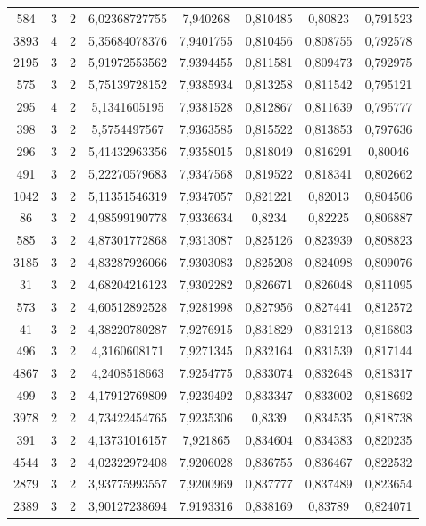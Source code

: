 \begin{longtable}{|c|c|c|c|c|c|c|c|}
584 & 3 & 2 & 6,02368727755 & 7,940268 & 0,810485 & 0,80823 & 0,791523 \\
3893 & 4 & 2 & 5,35684078376 & 7,9401755 & 0,810456 & 0,808755 & 0,792578 \\
2195 & 3 & 2 & 5,91972553562 & 7,9394455 & 0,811581 & 0,809473 & 0,792975 \\
575 & 3 & 2 & 5,75139728152 & 7,9385934 & 0,813258 & 0,811542 & 0,795121 \\
295 & 4 & 2 & 5,1341605195 & 7,9381528 & 0,812867 & 0,811639 & 0,795777 \\
398 & 3 & 2 & 5,5754497567 & 7,9363585 & 0,815522 & 0,813853 & 0,797636 \\
296 & 3 & 2 & 5,41432963356 & 7,9358015 & 0,818049 & 0,816291 & 0,80046 \\
491 & 3 & 2 & 5,22270579683 & 7,9347568 & 0,819522 & 0,818341 & 0,802662 \\
1042 & 3 & 2 & 5,11351546319 & 7,9347057 & 0,821221 & 0,82013 & 0,804506 \\
86 & 3 & 2 & 4,98599190778 & 7,9336634 & 0,8234 & 0,82225 & 0,806887 \\
585 & 3 & 2 & 4,87301772868 & 7,9313087 & 0,825126 & 0,823939 & 0,808823 \\
3185 & 3 & 2 & 4,83287926066 & 7,9303083 & 0,825208 & 0,824098 & 0,809076 \\
31 & 3 & 2 & 4,68204216123 & 7,9302282 & 0,826671 & 0,826048 & 0,811095 \\
573 & 3 & 2 & 4,60512892528 & 7,9281998 & 0,827956 & 0,827441 & 0,812572 \\
41 & 3 & 2 & 4,38220780287 & 7,9276915 & 0,831829 & 0,831213 & 0,816803 \\
496 & 3 & 2 & 4,3160608171 & 7,9271345 & 0,832164 & 0,831539 & 0,817144 \\
4867 & 3 & 2 & 4,2408518663 & 7,9254775 & 0,833074 & 0,832648 & 0,818317 \\
499 & 3 & 2 & 4,17912769809 & 7,9239492 & 0,833347 & 0,833002 & 0,818692 \\
3978 & 2 & 2 & 4,73422454765 & 7,9235306 & 0,8339 & 0,834535 & 0,818738 \\
391 & 3 & 2 & 4,13731016157 & 7,921865 & 0,834604 & 0,834383 & 0,820235 \\
4544 & 3 & 2 & 4,02322972408 & 7,9206028 & 0,836755 & 0,836467 & 0,822532 \\
2879 & 3 & 2 & 3,93775993557 & 7,9200969 & 0,837777 & 0,837489 & 0,823654 \\
2389 & 3 & 2 & 3,90127238694 & 7,9193316 & 0,838169 & 0,83789 & 0,824071 \\

\end{longtable}

